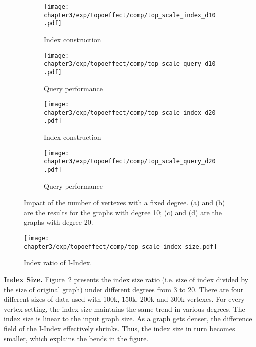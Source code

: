\begin{figure}[t]
\centering
\begin{subfigure}{0.45\linewidth}
  \centering
  \texttt{[image: chapter3/exp/topoeffect/comp/top\_scale\_index\_d10.pdf]}
  \caption{Index construction }
\end{subfigure}
\begin{subfigure}{0.45\linewidth}
  \centering
  \texttt{[image: chapter3/exp/topoeffect/comp/top\_scale\_query\_d10.pdf]}
  \caption{Query performance}
\end{subfigure}
\begin{subfigure}{0.45\linewidth}
  \centering
  \texttt{[image: chapter3/exp/topoeffect/comp/top\_scale\_index\_d20.pdf]}
  \caption{Index construction}
\end{subfigure}
\begin{subfigure}{0.45\linewidth}
  \centering
  \texttt{[image: chapter3/exp/topoeffect/comp/top\_scale\_query\_d20.pdf]}
  \caption{Query performance}
\end{subfigure}
\caption{Impact of the number of vertexes with a fixed degree. (a) and (b) 
are the results for the graphs with degree 10; (c) and (d) 
are the graphs with degree 20. }
\label{fig:pi_effect2}
\end{figure}

\begin{figure}[h]
\centering
\texttt{[image: chapter3/exp/topoeffect/comp/top\_scale\_index\_size.pdf]}
\caption{Index ratio of I-Index.}
\label{fig:top-index-size}
\end{figure}


\textbf{Index Size.} Figure~\ref{fig:top-index-size} presents
the index size ratio (i.e. size of index divided by the size of original graph) under different degrees from 3 to 20. 
There are four different sizes of data used with 100k, 150k, 200k and 300k vertexes.  
For every vertex setting, the index size maintains the same trend in various degrees. The index size is linear to the input graph size. 
As a graph gets denser, the difference field of the I-Index
effectively shrinks. Thus, the index size in turn becomes smaller, which explains the bends in the figure.




